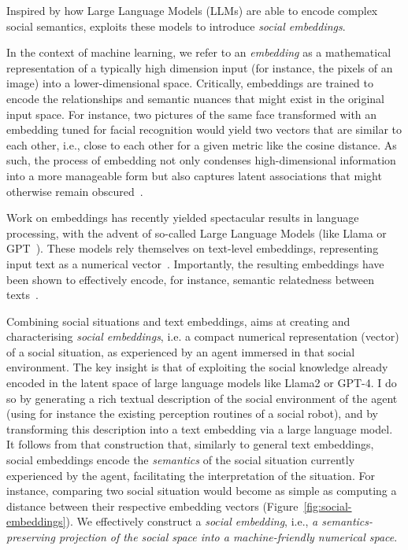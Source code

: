 Inspired by how Large Language Models (LLMs) are able to encode complex social
semantics, \project exploits these models to introduce \emph{social embeddings}.

In the context of machine learning, we refer to an \emph{embedding} as a
mathematical representation of a typically high dimension input (for instance,
the pixels of an image) into a lower-dimensional space. Critically, embeddings
are trained to encode the relationships and semantic nuances that might exist in
the original input space. For instance, two pictures of the same face
transformed with an embedding tuned for facial recognition would yield two
vectors that are similar to each other, i.e., close to each other for a given
metric like the cosine distance. As such, the process of embedding not
only condenses high-dimensional information into a more manageable form but also
captures latent associations that might otherwise remain
obscured~\cite{bengio2009learning}.

Work on embeddings has recently yielded spectacular results in language
processing, with the advent of so-called Large Language Models (like Llama or
GPT~\cite{devlin2019bert,wolf2020transformers}). These models rely themselves on
text-level embeddings, representing input text as a numerical
vector~\cite{reimers2019sentencebert,muennighoff2022sgpt}. Importantly, the
resulting embeddings have been shown to effectively encode, for instance,
semantic relatedness between texts~\cite{thakur2021beir}.

Combining social situations and text embeddings, \project aims at creating and
characterising \emph{social embeddings}, i.e. a compact numerical
representation (vector) of a social situation, as experienced by an agent
immersed in that social environment. 
The key insight is that of exploiting the social knowledge already encoded in
the latent space of large language models like Llama2 or GPT-4. I do so by
generating a rich textual description of the social environment of the agent
(using for instance the existing perception routines of a social robot), and by
transforming this description into a text embedding via a large language model.
It follows from that construction that, similarly to general text embeddings,
social embeddings encode the \emph{semantics} of the social situation currently
experienced by the agent, facilitating the interpretation of the situation. For
instance, comparing two social situation would become as simple as computing a
distance between their respective embedding vectors
(Figure~\ref{fig:social-embeddings}).  We effectively construct a \emph{social
embedding}, i.e., \emph{a semantics-preserving projection of the social space into a machine-friendly
numerical space}.


